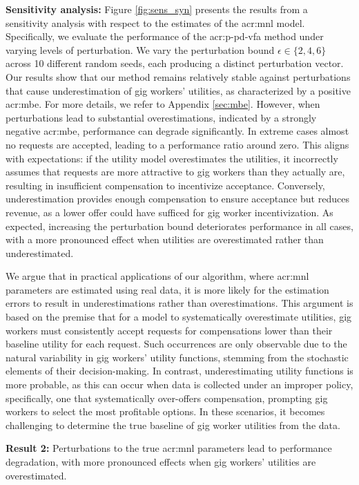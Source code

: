 \noindent \textbf{Sensitivity analysis:} Figure \ref{fig:sens_syn} presents the results from a sensitivity analysis with respect to the estimates of the \gls{acr:mnl} model. Specifically, we evaluate the performance of the \gls{acr:p-pd-vfa} method under varying levels of perturbation. We vary the perturbation bound $\epsilon \in \{2, 4, 6\}$ across 10 different random seeds, each producing a distinct perturbation vector. Our results show that our method remains relatively stable against perturbations that cause underestimation of gig workers' utilities, as characterized by a positive \gls{acr:mbe}. For more details, we refer to Appendix \ref{sec:mbe}. However, when perturbations lead to substantial overestimations, indicated by a strongly negative \gls{acr:mbe}, performance can degrade significantly. In extreme cases almost no requests are accepted, leading to a performance ratio around zero. This aligns with expectations: if the utility model overestimates the utilities, it incorrectly assumes that requests are more attractive to gig workers than they actually are, resulting in insufficient compensation to incentivize acceptance. Conversely, underestimation provides enough compensation to ensure acceptance but reduces revenue, as a lower offer could have sufficed for gig worker incentivization. As expected, increasing the perturbation bound deteriorates performance in all cases, with a more pronounced effect when utilities are overestimated rather than underestimated.

We argue that in practical applications of our algorithm, where \gls{acr:mnl} parameters are estimated using real data, it is more likely for the estimation errors to result in underestimations rather than overestimations. This argument is based on the premise that for a model to systematically overestimate utilities, gig workers must consistently accept requests for compensations lower than their baseline utility for each request. Such occurrences are only observable due to the natural variability in gig workers' utility functions, stemming from the stochastic elements of their decision-making. In contrast, underestimating utility functions is more probable, as this can occur when data is collected under an improper policy, specifically, one that systematically over-offers compensation, prompting gig workers to select the most profitable options. In these scenarios, it becomes challenging to determine the true baseline of gig worker utilities from the data. 

\noindent \textbf{Result 2:} Perturbations to the true \gls{acr:mnl} parameters lead to performance degradation, with more pronounced effects when gig workers' utilities are overestimated.

